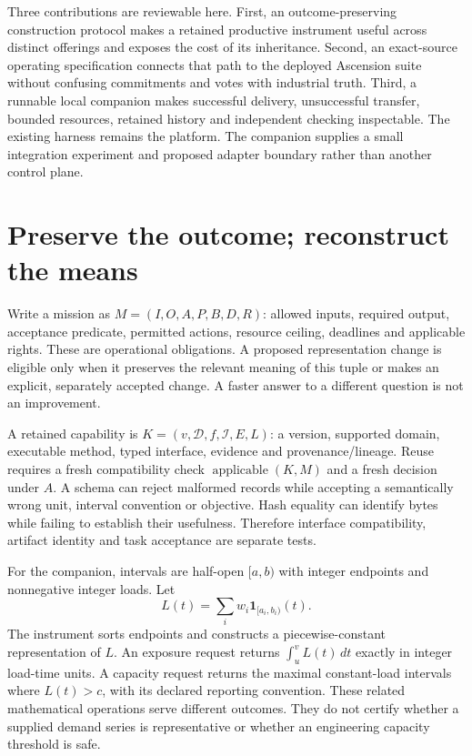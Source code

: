 \documentclass[11pt,letterpaper]{article}
\begin{document}
Three contributions are reviewable here. First, an outcome-preserving construction protocol makes a retained productive instrument useful across distinct offerings and exposes the cost of its inheritance. Second, an exact-source operating specification connects that path to the deployed Ascension suite without confusing commitments and votes with industrial truth. Third, a runnable local companion makes successful delivery, unsuccessful transfer, bounded resources, retained history and independent checking inspectable. The existing harness remains the platform. The companion supplies a small integration experiment and proposed adapter boundary rather than another control plane.

\section{Preserve the outcome; reconstruct the means}
Write a mission as $M=(I,O,A,P,B,D,R)$: allowed inputs, required output, acceptance predicate, permitted actions, resource ceiling, deadlines and applicable rights. These are operational obligations. A proposed representation change is eligible only when it preserves the relevant meaning of this tuple or makes an explicit, separately accepted change. A faster answer to a different question is not an improvement.

A retained capability is $K=(v,\mathcal{D},f,\mathcal{I},E,L)$: a version, supported domain, executable method, typed interface, evidence and provenance/lineage. Reuse requires a fresh compatibility check $\operatorname{applicable}(K,M)$ and a fresh decision under $A$. A schema can reject malformed records while accepting a semantically wrong unit, interval convention or objective. Hash equality can identify bytes while failing to establish their usefulness. Therefore interface compatibility, artifact identity and task acceptance are separate tests.

For the companion, intervals are half-open $[a,b)$ with integer endpoints and nonnegative integer loads. Let
\begin{equation}
 L(t)=\sum_i w_i\mathbf{1}_{[a_i,b_i)}(t).
\end{equation}
The instrument sorts endpoints and constructs a piecewise-constant representation of $L$. An exposure request returns $\int_u^v L(t)\,dt$ exactly in integer load-time units. A capacity request returns the maximal constant-load intervals where $L(t)>c$, with its declared reporting convention. These related mathematical operations serve different outcomes. They do not certify whether a supplied demand series is representative or whether an engineering capacity threshold is safe.
\end{document}
